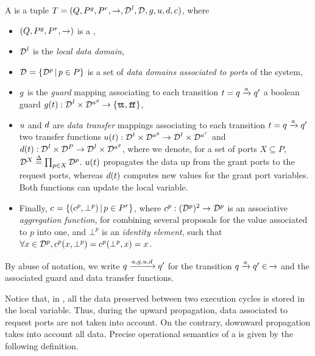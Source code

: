 \begin{definition}[\datamodel{}]
  \label{defn:data}
  A \emph{\datamodel{}} is a tuple $T=(Q, \pin, \pout, \goesto{},
  \local{\data}, \data, \guard, \up, \down, \combine)$, where
  \begin{itemize}
  \item $(Q, \pin, \pout, \goesto{})$ is a \compmodel{},
  \item $\local{\data}$ is the \emph{local data domain},
  \item $\data = \setdef{\data[p]}{p \in P}$ is a set of \emph{data domains
    associated to ports} of the system,
  \item $\guard$ is the \emph{guard} mapping associating to each transition
    $t = q \goesto{a} q'$ a boolean guard $\guard(t): \local{\data} \times
    \data[\grant{a}] \rightarrow \{\true,\false\}$,
  \item $\up$ and $\down$ are \emph{data transfer} mappings associating to
    each transition $t = q \goesto{a} q'$ two transfer functions $\up(t):
    \local{\data} \times \data[\grant{a}] \rightarrow \local{\data} \times
    \data[\request{a}]$ and $\down(t): \local{\data} \times \data[P]
    \rightarrow \local{\data} \times \data[\grant{a}]$, where we denote,
    for a set of ports $X \subseteq P$, $\data[X] \bydef{=} \prod_{p \in X}
    \data[p]$.  $\up(t)$ propagates the data up from the grant ports to the
    request ports, whereas $\down(t)$ computes new values for the grant
    port variables.  Both functions can update the local variable.
  \item Finally, $\combine = \setdef{(\combine[p], \bot^p)}{p \in \pout}$,
    where $\combine[p]: (\data[p])^2 \rightarrow \data[p]$ is an
    associative \emph{aggregation function}, for combining several
    proposals for the value associated to $p$ into one, and $\bot^p$ is an
    \emph{identity element}, such that $\forall x \in \data[p],
    \combine[p](x, \bot^p) = \combine[p](\bot^p, x) = x$.
  \end{itemize}

  By abuse of notation, we write $q \goesto{a,\guard,\up,\down} q'$ for
  the transition $q \goesto{a} q' \in\, \goesto{}$ and the associated guard
  and data transfer functions.
\end{definition}

Notice that, in , all the data preserved
between two execution cycles is stored in the local variable.  Thus, during
the upward propagation, data associated to request ports are not taken into
account.  On the contrary, downward propagation takes into account all
data.  Precise operational semantics of a \datamodel{} is given by the
following definition.

